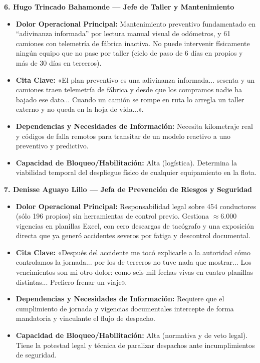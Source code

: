 \textbf{6. Hugo Trincado Bahamonde --- Jefe de Taller y Mantenimiento}
\begin{itemize}
    \item \textbf{Dolor Operacional Principal:} Mantenimiento preventivo fundamentado en ``adivinanza informada'' por lectura manual visual de odómetros, y 61 camiones con telemetría de fábrica inactiva. No puede intervenir físicamente ningún equipo que no pase por taller (ciclo de paso de 6 días en propios y más de 30 días en terceros).
    \item \textbf{Cita Clave:} «El plan preventivo es una adivinanza informada... sesenta y un camiones traen telemetría de fábrica y desde que los compramos nadie ha bajado ese dato... Cuando un camión se rompe en ruta lo arregla un taller externo y no queda en la hoja de vida...».
    \item \textbf{Dependencias y Necesidades de Información:} Necesita kilometraje real y códigos de falla remotos para transitar de un modelo reactivo a uno preventivo y predictivo.
    \item \textbf{Capacidad de Bloqueo/Habilitación:} Alta (logística). Determina la viabilidad temporal del despliegue físico de cualquier equipamiento en la flota.
\end{itemize}

\textbf{7. Denisse Aguayo Lillo --- Jefa de Prevención de Riesgos y Seguridad}
\begin{itemize}
    \item \textbf{Dolor Operacional Principal:} Responsabilidad legal sobre 454 conductores (sólo 196 propios) sin herramientas de control previo. Gestiona $\approx 6.000$ vigencias en planillas Excel, con cero descargas de tacógrafo y una exposición directa que ya generó accidentes severos por fatiga y descontrol documental.
    \item \textbf{Cita Clave:} «Después del accidente me tocó explicarle a la autoridad cómo controlamos la jornada... por los de terceros no tuve nada que mostrar... Los vencimientos son mi otro dolor: como seis mil fechas vivas en cuatro planillas distintas... Prefiero frenar un viaje».
    \item \textbf{Dependencias y Necesidades de Información:} Requiere que el cumplimiento de jornada y vigencias documentales intercepte de forma mandatoria y vinculante el flujo de despacho.
    \item \textbf{Capacidad de Bloqueo/Habilitación:} Alta (normativa y de veto legal). Tiene la potestad legal y técnica de paralizar despachos ante incumplimientos de seguridad.
\end{itemize}

